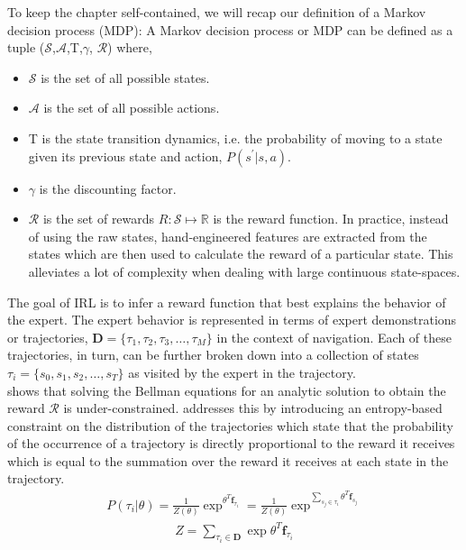To keep the chapter self-contained, we will recap our definition of a Markov decision process (MDP):
A Markov decision process or MDP can be defined as a tuple ($\mathcal{S}$,$\mathcal{A}$,T,$\gamma$, $\mathcal{R}$)  where,
\begin{itemize}
    \item $\mathcal{S}$ is the set of all possible states.
    \item $\mathcal{A}$ is the set of all possible actions.
    \item T is the state transition dynamics, i.e. the probability of moving to a state given its previous state and action, $P(s^{'}|s, a)$.
    \item $\gamma$ is the discounting factor.
    \item $\mathcal{R}$ is the set of rewards $R:  \mathcal{S} \mapsto \mathbb{R} $ is the reward function. In practice, instead of using the raw states, hand-engineered features are extracted from the states which are then used to calculate the reward of a particular state. This alleviates a lot of complexity when dealing with large continuous state-spaces. 
    \end{itemize}  
The goal of IRL is to infer a reward function that best explains the behavior of the expert. The expert behavior is represented in terms of expert demonstrations or trajectories, $\mathbf{D} = \{ \tau_1, \tau_2, \tau_3, \dots, 
\tau_{M} \}$ in the context of navigation. Each of these trajectories, in turn, can be further broken down into a collection of states $\tau_{i} = \{ s_{0}, s_{1}, s_{2}, \dots, s_{T} \}$ as visited by the expert in the trajectory. \\
\cite{abbeel_apprenticeshiplearning_2004} shows that solving the Bellman equations for an analytic solution to obtain the reward $\mathcal{R}$ is under-constrained. \cite{ziebart_maxent_2008} addresses this by introducing an entropy-based constraint \cite{jaynes1957information} on the distribution of the trajectories which state that the probability of the occurrence of a trajectory is directly proportional to the reward it receives which is equal to the summation over the reward it receives at each state in the trajectory.
\begin{align}
P(\tau_{i}| \theta) = \frac{1}{Z(\theta)}\exp^{\theta^{T}\mathbf{f}_{\tau_{i}}} = \frac{1}{Z(\theta)}\exp^{\sum_{s_{j}\in\tau_{i}}\theta^{T}\mathbf{f}_{s_{j}}}
\end{align}
\begin{align}
Z = \sum_{\tau_{i}\in \mathbf{D}}\exp{\theta^{T}\mathbf{f}_{\tau_{i}}}
\end{align}

